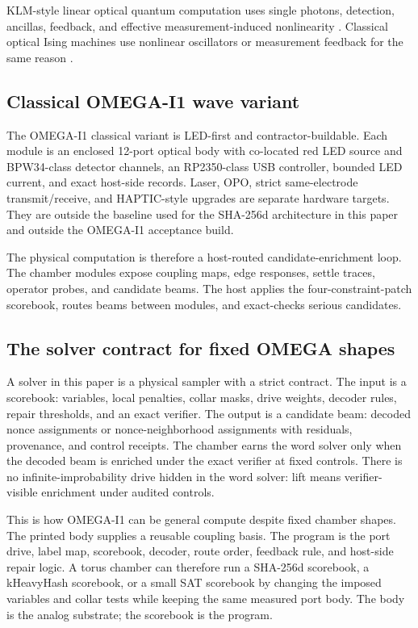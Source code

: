 \documentclass[11pt]{article}
\theoremstyle{definition}
\theoremstyle{remark}
\begin{document}
KLM-style linear optical quantum computation uses single photons, detection,
ancillas, feedback, and effective measurement-induced nonlinearity
\cite{KLM2001}. Classical optical Ising machines use nonlinear oscillators or
measurement feedback for the same reason \cite{Yamamoto2017,CIM100k2021}.

\subsection{Classical OMEGA-I1 wave variant}

The OMEGA-I1 classical variant is LED-first and contractor-buildable. Each
module is an enclosed 12-port optical body with co-located red LED source and
BPW34-class detector channels, an RP2350-class USB controller, bounded LED
current, and exact host-side records. Laser, OPO, strict same-electrode
transmit/receive, and HAPTIC-style upgrades are separate hardware targets. They
are outside the baseline used for the SHA-256d architecture in this paper
and outside the OMEGA-I1 acceptance build.

The physical computation is therefore a host-routed candidate-enrichment loop.
The chamber modules expose coupling maps, edge responses, settle traces,
operator probes, and candidate beams. The host applies the four-constraint-patch scorebook,
routes beams between modules, and exact-checks serious candidates.

\subsection{The solver contract for fixed OMEGA shapes}

A solver in this paper is a physical sampler with a strict contract. The input is
a scorebook: variables, local penalties, collar masks, drive weights, decoder
rules, repair thresholds, and an exact verifier. The output is a candidate beam:
decoded nonce assignments or nonce-neighborhood assignments with residuals,
provenance, and control receipts. The chamber earns the word solver only when
the decoded beam is enriched under the exact verifier at fixed controls.
There is no infinite-improbability drive hidden in the word solver: lift means
verifier-visible enrichment under audited controls.

This is how OMEGA-I1 can be general compute despite fixed chamber shapes. The
printed body supplies a reusable coupling basis. The program is the port drive,
label map, scorebook, decoder, route order, feedback rule, and host-side repair
logic. A torus chamber can therefore run a SHA-256d scorebook, a kHeavyHash
scorebook, or a small SAT scorebook by changing the imposed variables and collar
tests while keeping the same measured port body. The body is the analog
substrate; the scorebook is the program.
\end{document}

